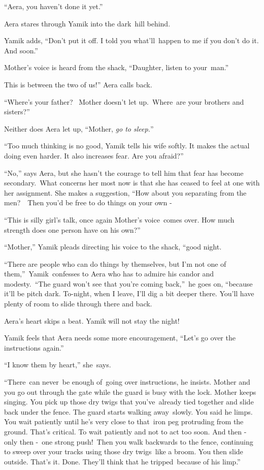 \documentclass[twoside,11pt]{book}
\begin{document}
{}``Aera, you haven't done it yet.''~ 

Aera stares through Yamik into the dark\ hill behind. 

Yamik adds, {}``Don't put it off. I told you what{}'ll\ happen to me if you don't do it. And soon.'' 

Mother's voice is heard from the shack, ``Daughter, listen to your~man.'' 

{\textquotedbl}This is between the two of us!'' Aera calls back.

{}``Where's your father?{\textquotedbl} ~Mother doesn't let up.\ {\textquotedbl}Where{\ }are your
brothers and sisters?'' 

Neither does Aera let up, ``Mother, \textit{go to sleep.}{}'' 

{}``Too much thinking is no good,{\textquotedbl} Yamik tells his wife softly. {\textquotedbl}It makes the actual doing
even harder. It also increases fear. Are you afraid?'' 

{}``No,'' says Aera, but she hasn't the courage to tell him that fear has become secondary.\ What concerns her most now
is that she has ceased to feel at one with her assignment. She makes a suggestion, ``How about you separating from the
men?\ \ Then you'd be free to do things on your own -{\textquotedbl}\ 

{}``This is silly girl's talk,{\textquotedbl} once again Mother's voice\ comes over. {\textquotedbl}How much strength
does one person have on his own?'' 

{}``Mother,'' Yamik pleads directing his voice to the shack, ``good night.{\textquotedbl} 

{}``There are people who can do things by themselves, but I'm not one of
them,{}''\ Yamik{\ }confesses to Aera who has to admire his candor and
modesty.\ {}``The guard won't see that you're coming back,{}''\ he goes on, ``because it'll be pitch dark. To-night,
when I leave, I'll dig a bit deeper there. You'll have plenty of room to slide through there and back.{\textquotedbl} 

Aera's heart skips a beat. Yamik will not stay the night! 

Yamik feels that Aera needs some more encouragement, ``Let's go over the instructions again.'' 

{}``I know them by heart,'' she\ says. 

{}``There~can never~be enough of~going over instructions,{\textquotedbl} he insists. {\textquotedbl}Mother and you go
out through the gate while the guard is busy with the lock. Mother keeps singing. You pick up those dry twigs that
you've~already tied together and slide back under the fence. The guard starts walking away\ slowly. You said he limps.
You wait patiently until he's very close to that~iron peg protruding from the ground. That's critical. To wait
patiently and not to act too soon. And then -  only then -\ one strong push!\ Then you walk backwards to the fence,
continuing to sweep over your tracks using those dry twigs{\ }like a broom. You
then slide outside. That's it. Done. They'll think that he tripped{\ }because
of his limp.'' 
\end{document}
